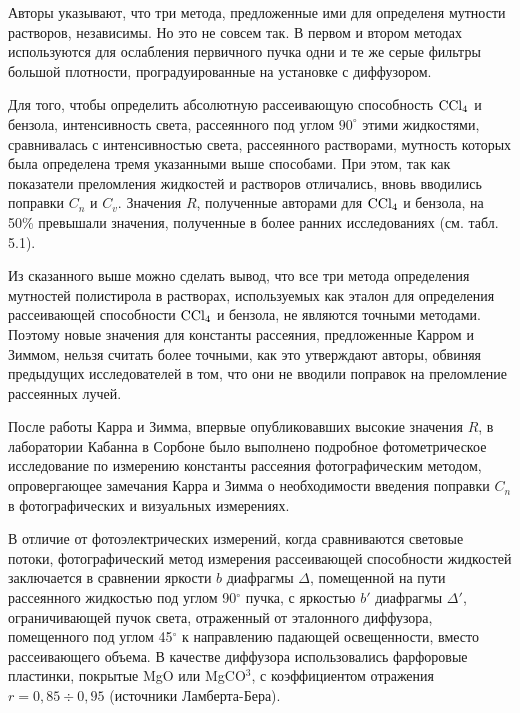 Авторы указывают, что три метода, предложенные ими для определеня
мутности растворов, независимы. Но это не совсем так. В первом
и втором методах используются для ослабления первичного пучка
одни и те же серые фильтры большой плотности, проградуированные
на установке с диффузором.

Для того, чтобы определить абсолютную рассеивающую способность
$\rm CCl_4$ и бензола, интенсивность света, рассеянного под углом
$90^{\circ}$ этими жидкостями, сравнивалась с интенсивностью
света, рассеянного растворами, мутность которых была определена
тремя указанными  выше способами. При этом, так как показатели
преломления жидкостей и растворов отличались, вновь вводились
поправки $C_n$ и $C_v$. Значения $R$, полученные авторами для
$\rm CCl_4$ и бензола, на 50\% превышали значения, полученные в
более ранних исследованиях (см. табл. 5.1).

Из сказанного выше можно сделать вывод, что все три метода
определения мутностей полистирола в растворах, используемых как
эталон для определения рассеивающей способности $\rm CCl_4$ и
бензола, не являются точными методами. Поэтому новые значения для
константы рассеяния, предложенные Карром и Зиммом, нельзя считать
более точными, как это утверждают авторы, обвиняя предыдущих
исследователей в том, что они не вводили поправок на преломление
рассеянных лучей.




После работы Карра и Зимма, впервые опубликовавших высокие значения $R$, 
в лаборатории Кабанна в Сорбоне было выполнено подробное фотометрическое
исследование по измерению константы рассеяния фотографическим методом, 
опровергающее замечания Карра и Зимма о необходимости 
введения поправки $C_n$ в фотографических и визуальных измерениях.

В отличие от фотоэлектрических измерений, 
когда сравниваются световые потоки, фотографический метод измерения рассеивающей способности жидкостей заключается в сравнении яркости $b$ диафрагмы $\Delta$,
помещенной на пути рассеянного жидкостью под углом 90$^\circ$ пучка, с яркостью $b'$ диафрагмы $\Delta '$, ограничивающей пучок света, отраженный от эталонного диффузора, помещенного под углом 45$^\circ$ к направлению падающей освещенности, вместо рассеивающего объема. В качестве диффузора использовались фарфоровые пластинки, покрытые MgO или MgCO$^3$, с коэффициентом отражения $r=0,85\div0,95$ (источники Ламберта-Бера).

